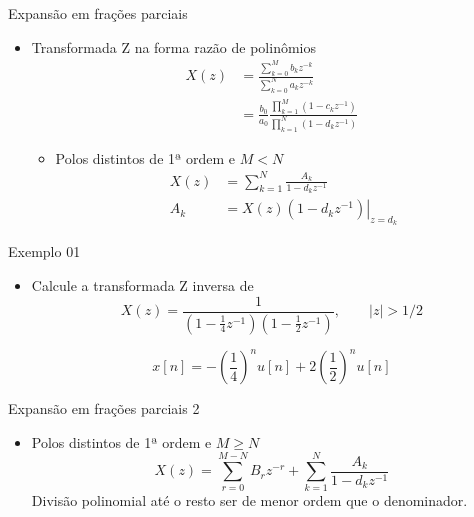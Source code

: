 \begin{slide}{Expansão em frações parciais}
\begin{itemize}
   \item Transformada Z na forma razão de polinômios
   \begin{align*}
      X(z) &= \frac{\sum_{k=0}^M b_k z^{-k}}{\sum_{k=0}^N a_k z^{-k}}\\
           &= \frac{b_0}{a_0}\frac{\prod_{k=1}^M (1-c_k z^{-1})}{\prod^N_{k=1}(1-d_k z^{-1})}
   \end{align*}
   \begin{itemize}
       \item Polos distintos de 1ª ordem e $M<N$
      \begin{align*}
         X(z) &= \sum_{k=1}^N\frac{A_k}{1-d_kz^{-1}}\\
         A_k &= X(z)\left .(1-d_kz^{-1})\right |_{z=d_k}
      \end{align*}
   \end{itemize}
\end{itemize}
\end{slide}

\begin{slide}{Exemplo 01}
\begin{itemize}
   \item Calcule a transformada Z inversa de
      \begin{equation*}
         X(z) = \frac{1}{\left (1-\frac{1}{4}z^{-1} \right ) \left (1-\frac{1}{2}z^{-1} \right )}, \qquad |z|>1/2
      \end{equation*}\pause
      
      \begin{equation*}
         x[n] = -\left (\frac{1}{4}\right )^n u[n] + 2\left ( \frac{1}{2} \right )^n u[n]
      \end{equation*}
\end{itemize}
\end{slide}


\begin{slide}{Expansão em frações parciais 2}
\begin{itemize}
   \item Polos distintos de 1ª ordem e $M\geq N$
   \begin{equation*}
      X(z) = \sum_{r=0}^{M-N}B_rz^{-r}+\sum_{k=1}^N\frac{A_k}{1-d_kz^{-1}}
   \end{equation*}
   Divisão polinomial até o resto ser de menor ordem que o denominador.
\end{itemize}
\end{slide}


